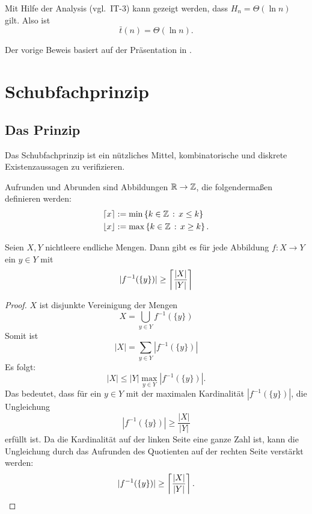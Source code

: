 \begin{bem}
	Mit Hilfe der Analysis (vgl.~IT-3) kann gezeigt werden, dass $H_n= \Theta(\ln n)$ gilt. Also ist 
	\[
		\bar{t}(n) = \Theta(\ln n). 
	\]
\end{bem} 

\begin{bem}
	Der vorige Beweis basiert auf der Präsentation in \cite[Kap.~25, Abs.~4]{AZ02}. 
\end{bem} 

\section{Schubfachprinzip} 

\subsection{Das Prinzip} 

\begin{bem}
	Das Schubfachprinzip ist ein nützliches Mittel, kombinatorische und diskrete  Existenzaussagen zu verifizieren. 
\end{bem} 

\begin{defn}
	Aufrunden und Abrunden sind Abbildungen $\mathbb{R} \to \mathbb{Z}$, die folgendermaßen definieren werden: 
	\begin{align*}
			\left\lceil x \right\rceil & := \min \left\{ k \in \mathbb{Z} \,:\, x \le k \right\}
			\\ \left\lfloor x \right\rfloor & := \max \left\{ k \in \mathbb{Z} \,:\, x \ge k \right\}. 
	\end{align*} 
\end{defn} 


\begin{prop} \label{prop:schubfach:stark}
	Seien $X, Y$ nichtleere endliche Mengen. Dann gibt es für jede Abbildung $f: X \to Y$ ein $y \in Y$ mit 
	\[
		|f^{-1} (\{y\})|  \ge  \left\lceil \frac{|X|}{|Y|} \right\rceil 
	\]
\end{prop} 
\begin{proof} $X$ ist disjunkte Vereinigung der Mengen 
	\[
			X = \bigcup_{y \in Y} f^{-1}(\{y\}) 
	\]
	Somit ist 
	\[
		|X| = \sum_{y \in Y} | f^{-1}(\{y\}) | 
	\]
	Es folgt: 
	\[
		|X| \le |Y| \max_{y \in Y} |f^{-1}(\{y\}) |. 
	\]
	Das bedeutet, dass für ein $y \in Y$ mit der maximalen Kardinalität $|f^{-1}(\{y\}) |$, die Ungleichung 
	\[
			|f^{-1}(\{y\})| \ge \frac{|X|}{|Y|}
	\]
	erfüllt ist. Da die Kardinalität auf der linken Seite eine ganze Zahl ist, kann die Ungleichung durch das Aufrunden des Quotienten auf der rechten Seite verstärkt werden: 
	\[
			|f^{-1}(\{y\})| \ge \left\lceil \frac{|X|}{|Y|} \right\rceil.
	\]
\end{proof} 


